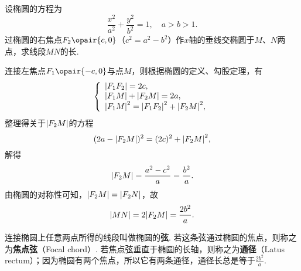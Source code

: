 \begin{example}
设椭圆的方程为\[
\frac{x^2}{a^2}+\frac{y^2}{b^2}=1, \quad a>b>1.
\]过椭圆的右焦点\(F_2\opair{c,0}\)（\(c^2=a^2-b^2\)）作\(x\)轴的垂线交椭圆于\(M\)、\(N\)两点，求线段\(MN\)的长.
\begin{solution}
连接左焦点\(F_1\opair{-c,0}\)与点\(M\)，则根据椭圆的定义、勾股定理，有\[
\left\{ \begin{array}{l}
\abs{F_1 F_2} = 2c, \\
\abs{F_1 M} + \abs{F_2 M} = 2a, \\
\abs{F_1 M}^2 = \abs{F_1 F_2}^2 + \abs{F_2 M}^2,
\end{array} \right.
\]整理得关于\(\abs{F_2 M}\)的方程\[
(2a - \abs{F_2 M})^2 = (2c)^2 + \abs{F_2 M}^2,
\]解得\[
\abs{F_2 M} = \frac{a^2 - c^2}{a} = \frac{b^2}{a}.
\]由椭圆的对称性可知，\(\abs{F_2 M} = \abs{F_2 N}\)，故\[
\abs{MN} = 2\abs{F_2 M} = \frac{2 b^2}{a}.
\]
\end{solution}

连接椭圆上任意两点所得的线段叫做椭圆的\textbf{弦}.
若这条弦通过椭圆的焦点，则称之为\textbf{焦点弦}（Focal chord）.
若焦点弦垂直于椭圆的长轴，则称之为\textbf{通径}（Latus rectum）；因为椭圆有两个焦点，所以它有两条通径，通径长总是等于\(\frac{2b^2}{a}\).
\end{example}


